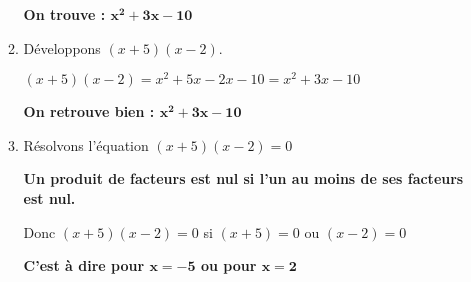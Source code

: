 \begin{enumerate}[itemsep=1em]
\begin{enumerate}[itemsep=1em]
        \textbf{On trouve : $\mathbf{x^2+3x-10}$}
        \item Développons $(x+5)(x-2)$.\par
        $(x+5)(x-2) = x^2 +5x-2x-10 = x^2+3x-10$\par
        \textbf{On retrouve bien : $\mathbf{x^2+3x-10}$}
        \item Résolvons l'équation $(x+5)(x-2)=0$\par
        \textbf{Un produit de facteurs est nul si l'un au moins de ses facteurs est nul.}\par
        Donc $(x+5)(x-2)=0$ si $(x+5)=0$ ou $(x-2)=0$\par
        \textbf{C'est à dire pour $\mathbf{x=-5}$ ou pour $\mathbf{x=2}$}
	\end{enumerate}
\end{enumerate}

\medskip

